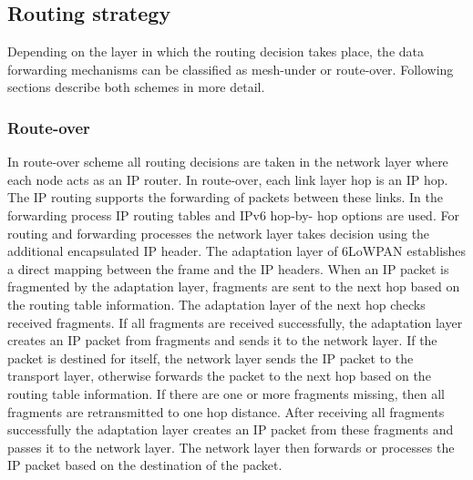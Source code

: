 \documentclass[11pt,final,onecolumn]{IEEEtran}
\begin{document}
\subsection{Routing strategy}
Depending on the layer in which the routing decision takes place, the data forwarding mechanisms can be classified as mesh-under or route-over. Following sections describe both schemes in more detail.

\subsubsection{Route-over}
In route-over scheme all routing decisions are taken in the network layer where each node acts as an IP router. In route-over, each link layer hop is an IP hop. The IP routing supports the forwarding of packets between these links. In the forwarding process IP routing tables and IPv6 hop-by- hop options are used. For routing and forwarding processes the network layer takes decision using the additional encapsulated IP header. The adaptation layer of 6LoWPAN establishes a direct mapping between the frame and the IP headers. When an IP packet is fragmented by the adaptation layer, fragments are sent to the next hop based on the routing table information. The adaptation layer of the next hop checks received fragments. If all fragments are received successfully, the adaptation layer creates an IP packet from fragments and sends it to the network layer. If the packet is destined for itself, the network layer sends the IP packet to the transport layer, otherwise forwards the packet to the next hop based on the routing table information. If there are one or more fragments missing, then all fragments are retransmitted to one hop distance. After receiving all fragments successfully the adaptation layer creates an IP packet from these fragments and passes it to the network layer. The network layer then forwards or processes the IP packet based on the destination of the packet.
\end{document}
